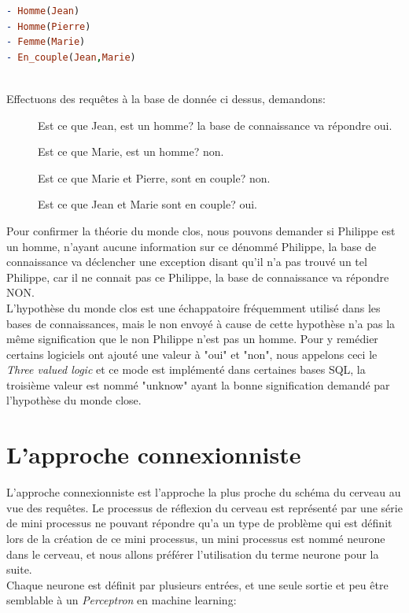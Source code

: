 \linebreak
\lstset{style=mlpythoncode}
\begin{lstlisting}[language=Prolog]
- Homme(Jean)
- Homme(Pierre)
- Femme(Marie)
- En_couple(Jean,Marie)
\end{lstlisting}
\ \\
Effectuons des requêtes à la base de donnée ci dessus, demandons:
\begin{description}
\item[] Est ce que Jean, est un homme? la base de connaissance va répondre oui.
\item[] Est ce que Marie, est un homme? non.
\item[] Est ce que Marie et Pierre, sont en couple? non.
\item[] Est ce que Jean et Marie sont en couple? oui.
\end{description}

Pour confirmer la théorie du monde clos, nous pouvons demander si Philippe est un homme, n'ayant aucune information sur ce dénommé Philippe, la base de connaissance va déclencher une exception disant qu'il n'a pas trouvé un tel Philippe, car il ne connait pas ce Philippe, la base de connaissance va répondre NON.\\ 
\linebreak L'hypothèse du monde clos est une échappatoire fréquemment utilisé dans les bases de connaissances, mais le non envoyé à cause de cette hypothèse n'a pas la même signification que le non Philippe n'est pas un homme. Pour y remédier certains logiciels ont ajouté une valeur à "oui" et "non", nous appelons ceci le \textit{Three valued logic} et ce mode est implémenté dans certaines bases SQL, la troisième valeur est nommé "unknow" ayant la bonne signification demandé par l'hypothèse du monde close.

\pagebreak
\section{L'approche connexionniste}
L'approche connexionniste est l'approche la plus proche du schéma du cerveau au vue des requêtes. Le processus de réflexion du cerveau est représenté par une série de mini processus ne pouvant répondre qu'a un type de problème qui est définit lors de la création de ce mini processus, un mini processus est nommé neurone dans le cerveau, et nous allons préférer l'utilisation du terme neurone pour la suite. \\
Chaque neurone est définit par plusieurs entrées, et une seule sortie et peu être semblable à un \textit{Perceptron} en machine learning:

